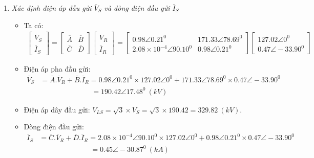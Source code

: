 \documentclass[12pt,a4paper]{article}
\newcommand{\unitp}[1]{~\left({#1}\right)}
\begin{document}
\begin{enumerate}[\it a.]
		\item \emph{Xác định điện áp đầu gửi $\overline{V}_S$ và dòng điện đầu gửi $\overline{I}_S$}
			\begin{itemize}
				\item Ta có:
					\begin{align*}
						\left[{\begin{array}{c}
							\overline{V}_S\\
							\overline{I}_S
						\end{array}}\right]
						=
						\left[{\begin{array}{cc}
							\overline{A} & \overline{B}\\
							\overline{C} & \overline{D}
						\end{array}}\right]
						\left[{\begin{array}{c}
							\overline{V}_R\\
							\overline{I}_R
						\end{array}}\right]
						=
						\left[{\begin{array}{cc}
							0.98 \angle 0.21^0 & 171.33 \angle 78.69^0\\
							2.08 \times 10^{-4} \angle 90.10^0 & 0.98 \angle 0.21^0
						\end{array}}\right]
						\left[{\begin{array}{c}
							127.02 \angle 0^0\\
							0.47 \angle -33.90^0
						\end{array}}\right]
					\end{align*}

				\item Điện áp pha đầu gửi:
					\begin{align*}
						\overline{V}_S & = \overline{A}. \overline{V}_R + \overline{B}.\overline{I}_R = 0.98 \angle 0.21^0 \times 127.02 \angle 0^0 + 171.33 \angle 78.69^0 \times 0.47 \angle -33.90^0 \\
						& \hspace{3cm} = 190.42 \angle 17.48^0 \unitp{kV}
					\end{align*}

				\item Điện áp dây đầu gửi: $V_{LS} = \sqrt{3} \times V_S = \sqrt{3} \times 190.42 = 329.82 \unitp{kV}$.

				\item Dòng điện đầu gửi:
					\begin{align*}
						\overline{I}_S & = \overline{C}. \overline{V}_R + \overline{D}.\overline{I}_R= 2.08 \times 10^{-4} \angle 90.10^0 \times 127.02 \angle 0^0 + 0.98 \angle 0.21^0 \times 0.47 \angle -33.90^0 \\
						&\hspace{3cm} = 0.45 \angle -30.87^0 \unitp{kA}
					\end{align*}
			\end{itemize}


\end{enumerate}
\end{document}
